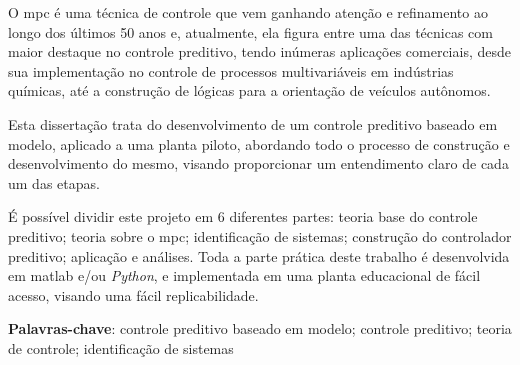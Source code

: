\setlength{\absparsep}{18pt} %
\begin{resumo}
    O \acrshort{mpc} é uma técnica de controle que vem ganhando atenção e refinamento
    ao longo dos últimos 50 anos e, atualmente, ela figura entre uma das técnicas
    com maior destaque no controle preditivo, tendo inúmeras aplicações comerciais,
    desde sua implementação no controle de processos multivariáveis em indústrias químicas,
    até a construção de lógicas para a orientação de veículos autônomos.

    Esta dissertação trata do desenvolvimento de um controle preditivo baseado em modelo,
    aplicado a uma planta piloto, abordando todo o processo de construção e desenvolvimento
    do mesmo, visando proporcionar um entendimento claro de cada um das etapas.

    É possível dividir este projeto em 6 diferentes partes: teoria base do controle
    preditivo; teoria sobre o \acrshort{mpc}; identificação de sistemas; construção do
    controlador preditivo; aplicação e análises. Toda a parte prática deste trabalho é
    desenvolvida em \acrshort{matlab} e/ou \textit{Python}, e implementada em uma
    planta educacional de fácil acesso, visando uma fácil replicabilidade.
    
    \vspace{\onelineskip}

    \noindent 
    \textbf{Palavras-chave}: controle preditivo baseado em modelo; controle preditivo; teoria de controle; identificação de sistemas
\end{resumo}